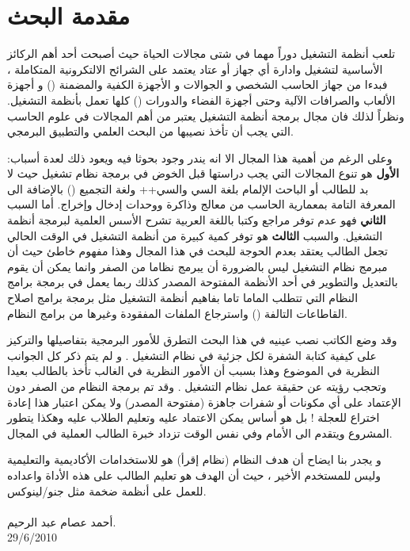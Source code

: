 \documentclass[document.tex]{subfiles}
\begin{document}
\chapter*{مقدمة البحث}
تلعب أنظمة التشغيل دوراً مهما في شتى مجالات الحياة حيث أصبحت أحد أهم الركائز الأساسية لتشغيل وادارة أي جهاز أو عتاد يعتمد على الشرائح الالتكرونية المتكاملة ، فبدءا من جهاز الحاسب الشخصي و الجوالات و الأجهزة الكفية والمضمنة () و أجهزة الألعاب والصرافات الآلية وحتى أجهزة الفضاء والدورات () كلها تعمل بأنظمة التشغيل. ونظراً لذلك فان مجال برمجة أنظمة التشغيل يعتبر من أهم المجالات في علوم الحاسب التي يجب أن تأخذ نصيبها من البحث العلمي والتطبيق البرمجي.

وعلى الرغم من أهمية هذا المجال الا انه يندر وجود بحوثا فيه ويعود ذلك لعدة أسباب: \textbf{الأول} هو  تنوع المجالات التي يجب دراستها قبل الخوض في برمجة نظام تشغيل حيث لا بد للطالب أو الباحث الإلمام بلغة السي والسي++ ولغة التجميع () بالإضافة الى المعرفة التامة بمعمارية الحاسب من معالج وذاكرة ووحدات إدخال وإخراج. أما السبب \textbf{الثاني} فهو عدم توفر مراجع وكتبا باللغة العربية تشرح الأسس العلمية لبرمجة أنظمة التشغيل. والسبب \textbf{الثالث} هو توفر كمية كبيرة من أنظمة التشغيل في الوقت الحالي تجعل الطالب يعتقد بعدم الحوجة للبحث في هذا المجال وهذا مفهوم خاطئ حيث أن مبرمج نظام التشغيل ليس بالضرورة أن يبرمج نظاما من الصفر وانما يمكن أن يقوم بالتعديل والتطوير في أحد الأنظمة المفتوحة المصدر كذلك ربما يعمل في برمجة برامج النظام التي تتطلب الماما تاما بفاهيم أنظمة التشغيل مثل برمجة برامج اصلاح القاطاعات التالفة () واسترجاع الملفات المفقودة وغيرها من برامج النظام.

وقد وضع الكاتب نصب عينيه في هذا البحث التطرق للأمور البرمجية بتفاصيلها والتركيز على كيفية كتابة الشفرة لكل جزئية في نظام التشغيل . و لم يتم ذكر كل الجوانب النظرية في الموضوع وهذا بسبب أن الأمور النظرية في الغالب تأخذ بالطالب بعيدا وتحجب رؤيته عن حقيقة عمل نظام التشغيل . وقد تم برمجة النظام من الصفر دون الإعتماد على أي مكونات أو شفرات جاهزة (مفتوحة المصدر) ولا يمكن اعتبار هذا إعادة اختراع للعجلة ! بل هو أساس يمكن الاعتماد عليه وتعليم الطلاب عليه وهكذا يتطور المشروع ويتقدم الى الأمام وفي نفس الوقت تزداد خبرة الطالب العملية في المجال.


 و يجدر بنا ايضاح أن هدف النظام (نظام إقرأ) هو للاستخدامات الأكاديمية والتعليمية وليس للمستخدم الأخير ، حيث أن الهدف هو تعليم الطالب على هذه الأداة واعداده للعمل على أنظمة ضخمة مثل جنو/لينوكس.\\\\

 \small{
أحمد عصام عبد الرحيم.\\
29/6/2010
}
\end{document}
